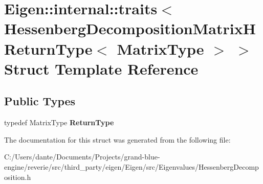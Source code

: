 \hypertarget{struct_eigen_1_1internal_1_1traits_3_01_hessenberg_decomposition_matrix_h_return_type_3_01_matrix_type_01_4_01_4}{}\section{Eigen\+::internal\+::traits$<$ Hessenberg\+Decomposition\+Matrix\+H\+Return\+Type$<$ Matrix\+Type $>$ $>$ Struct Template Reference}
\label{struct_eigen_1_1internal_1_1traits_3_01_hessenberg_decomposition_matrix_h_return_type_3_01_matrix_type_01_4_01_4}
\subsection*{Public Types}
\begin{DoxyCompactItemize}
\item 
\mbox{\label{struct_eigen_1_1internal_1_1traits_3_01_hessenberg_decomposition_matrix_h_return_type_3_01_matrix_type_01_4_01_4_a61ecfbcb348b94ba026196609af64ca4}} 
typedef Matrix\+Type {\bfseries Return\+Type}
\end{DoxyCompactItemize}


The documentation for this struct was generated from the following file\+:\begin{DoxyCompactItemize}
\item 
C\+:/\+Users/dante/\+Documents/\+Projects/grand-\/blue-\/engine/reverie/src/third\+\_\+party/eigen/\+Eigen/src/\+Eigenvalues/Hessenberg\+Decomposition.\+h\end{DoxyCompactItemize}
